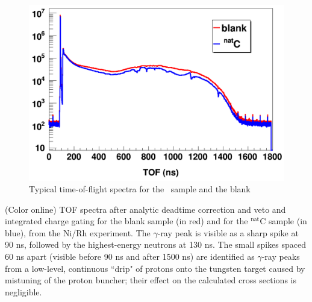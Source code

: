 \begin{figure}
    \includegraphics[scale=0.3]{figures/exampleTOFSpectrum.png}
    \caption{Typical time-of-flight spectra for the \cNat\ sample and the blank}
    \label{ExampleTOFSpectrum}
\end{figure}

(Color online) TOF spectra after analytic deadtime correction and
        veto and integrated charge gating for the blank sample (in
        red) and for the $^{\text{nat}}$C sample (in blue), from the Ni/Rh experiment.
        The $\gamma$-ray peak is visible as a sharp spike at 90 ns, followed by
        the highest-energy neutrons at 130 ns. The small spikes spaced 60 ns
        apart (visible before 90 ns and after 1500
        ns) are identified as $\gamma$-ray peaks from a low-level, continuous ``drip" 
        of protons onto the tungsten target caused by mistuning of the proton 
        buncher; their effect on the calculated cross sections is negligible.

